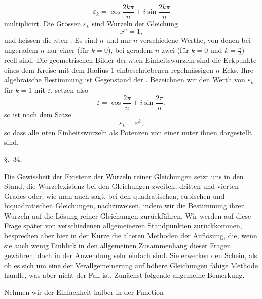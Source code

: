 
\begin{equation}
 \varepsilon_k=\cos\frac{2k\pi}{n}+i\sin\frac{2k\pi}{n}
\tag{11}
\end{equation}
multiplicirt. Die Grössen $\varepsilon_k$ sind Wurzeln der Gleichung
\begin{equation}
 x^n=1,
\tag{12}
\end{equation}
und heissen die $n$ten . Es sind $n$ und nur $n$ verschiedene Werthe, von denen bei ungeradem $n$ nur einer (für $k=0$), bei geradem $n$ zwei (für $k=0$ und $k=\frac n2$) reell sind. Die geometrischen Bilder der $n$ten Einheitswurzeln sind die Eckpunkte eines dem Kreise mit dem Radius $1$ einbeschriebenen regelmässigen $n$-Ecks. Ihre algebraische Bestimmung ist Gegenstand der . Bezeichnen wir den Werth von $\varepsilon_k$ für $k=1$ mit $\varepsilon$, setzen also
\[
 \varepsilon=\cos\frac{2\pi}{n}+i\sin\frac{2\pi}{n},
\]
so ist nach dem  Satze
\[
 \varepsilon_k=\varepsilon^k,
\]
so dass alle $n$ten Einheitswurzeln als Potenzen von einer unter ihnen dargestellt sind.


\begin{center}
{\large \S.\ 34.}

\vspace{0.5em}
{\large{}}
\end{center}

Die Gewissheit der Existenz der Wurzeln reiner Gleichungen setzt uns in den Stand, die Wurzelexistenz bei den Gleichungen zweiten, dritten und vierten Grades oder, wie man auch sagt, bei den quadratischen, cubischen und biquadratischen Gleichungen, nachzuweisen, indem wir die Bestimmung ihrer Wurzeln auf die Lösung reiner Gleichungen zurückführen. Wir werden auf diese Frage später von verschiedenen allgemeineren Standpunkten zurückkommen, besprechen aber hier in der Kürze die älteren Methoden der Auflösung, die, wenn sie auch wenig Einblick in den allgemeinen Zusammenhang dieser Fragen gewähren, doch in der Anwendung sehr einfach sind. Sie erwecken den Schein, als ob es sich um eine der Verallgemeinerung auf höhere Gleichungen fähige Methode handle, was aber nicht der Fall ist. Zunächst folgende allgemeine Bemerkung.

Nehmen wir der Einfachheit halber in der Function
